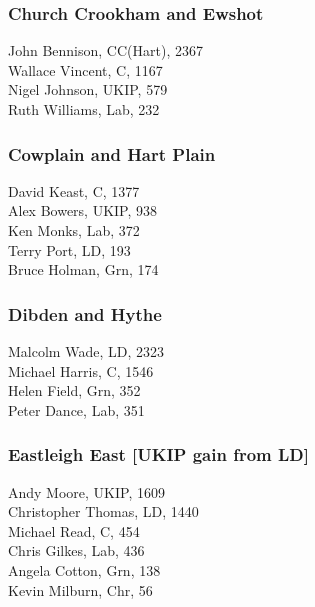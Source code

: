 \documentclass[a4paper,openany,10pt]{book}
\begin{document}
\subsubsection*{Church Crookham and Ewshot}



John Bennison, CC(Hart), 2367\\
Wallace Vincent, C, 1167\\
Nigel Johnson, UKIP, 579\\
Ruth Williams, Lab, 232\\


\subsubsection*{Cowplain and Hart Plain}



David Keast, C, 1377\\
Alex Bowers, UKIP, 938\\
Ken Monks, Lab, 372\\
Terry Port, LD, 193\\
Bruce Holman, Grn, 174\\


\subsubsection*{Dibden and Hythe}



Malcolm Wade, LD, 2323\\
Michael Harris, C, 1546\\
Helen Field, Grn, 352\\
Peter Dance, Lab, 351\\


\subsubsection*{Eastleigh East \hspace*{\fill}\nolinebreak[1]%
\enspace\hspace*{\fill}
[UKIP gain from LD]}



Andy Moore, UKIP, 1609\\
Christopher Thomas, LD, 1440\\
Michael Read, C, 454\\
Chris Gilkes, Lab, 436\\
Angela Cotton, Grn, 138\\
Kevin Milburn, Chr, 56\\
\end{document}
